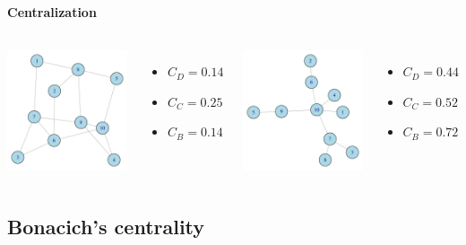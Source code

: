 \documentclass[8pt]{beamer}
\begin{document}
\begin{frame}
\frametitle{\insertsection}
\framesubtitle{Centralization}


\begin{columns}
	\centering  
	\includegraphics[width=5cm]{centralization1.pdf}
	
	\begin{itemize}
	\item $C_D = 0.14$
	\item $C_C = 0.25$
	\item $C_B = 0.14$
	\end{itemize}

	
	\centering  
	\includegraphics[width=5cm]{centralization2.pdf}
	
	\begin{itemize}
	\item $C_D = 0.44$
	\item $C_C = 0.52$
	\item $C_B = 0.72$
	\end{itemize}
	
\end{columns}
\end{frame}




\subsection{Bonacich's centrality}
\end{document}
